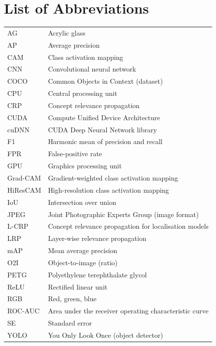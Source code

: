 \chapter*{List of Abbreviations}

\begin{tabular}{@{}p{}p{}@{}}
AG       & Acrylic glass \\
AP       & Average precision \\
CAM      & Class activation mapping \\
CNN      & Convolutional neural network \\
COCO     & Common Objects in Context (dataset) \\
CPU      & Central processing unit \\
CRP      & Concept relevance propagation \\
CUDA     & Compute Unified Device Architecture \\
cuDNN    & CUDA Deep Neural Network library \\
F1       & Harmonic mean of precision and recall \\
FPR      & False-positive rate \\
GPU      & Graphics processing unit \\
Grad-CAM & Gradient-weighted class activation mapping \\
HiResCAM & High-resolution class activation mapping \\
IoU      & Intersection over union \\
JPEG     & Joint Photographic Experts Group (image format) \\
L-CRP    & Concept relevance propagation for localisation models \\
LRP      & Layer-wise relevance propagation \\
mAP      & Mean average precision \\
O2I      & Object-to-image (ratio) \\
PETG     & Polyethylene terephthalate glycol \\
ReLU     & Rectified linear unit \\
RGB      & Red, green, blue \\
ROC-AUC  & Area under the receiver operating characteristic curve \\
SE       & Standard error \\
YOLO     & You Only Look Once (object detector) \\
\end{tabular}
